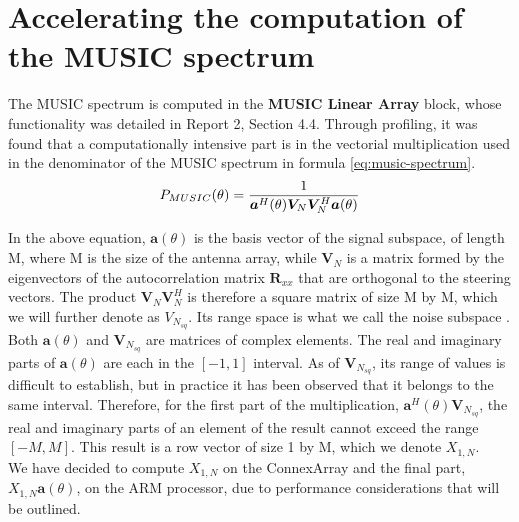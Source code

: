 \section{Accelerating the computation of the MUSIC spectrum}
\label{sec:acc-music}

The MUSIC spectrum is computed in the \textbf{MUSIC Linear Array} block, whose
functionality was detailed in Report 2, Section 4.4. Through profiling, it was
found that a computationally intensive part is in the vectorial multiplication
used in the denominator of the MUSIC spectrum in formula
\eqref{eq:music-spectrum}.
\begin{equation}
    P_{MUSIC}(\theta) =
        \frac{1}
             {\bm{a}^H(\theta)\bm{V}_N\bm{V}_N^H\bm{a}(\theta)} \\
\label{eq:music-spectrum}
\end{equation}

In the above equation, $\bm{a}(\theta)$ is the basis vector of the signal
subspace, of length M, where M is the size of the antenna array, while
$\bm{V}_N$ is a matrix formed by the eigenvectors of the autocorrelation matrix
$\bm{R}_{xx}$ that are orthogonal to the steering vectors. The product
$\bm{V}_N\bm{V}_N^H$ is therefore a square matrix of size M by M, which we will
further denote as $V_{N_{sq}}$. Its range space is what we call the noise
subspace \cite{cite:ettus-doa}. \\

Both $\bm{a}(\theta)$ and $\bm{V}_{N_{sq}}$ are matrices of complex elements. The
real and imaginary parts of $\bm{a}(\theta)$ are each in the $[-1, 1]$ interval.
As of $\bm{V}_{N_{sq}}$, its range of values is difficult to establish, but in
practice it has been observed that it belongs to the same interval. Therefore,
for the first part of the multiplication, $\bm{a}^H(\theta)\bm{V}_{N_{sq}}$, the
real and imaginary parts of an element of the result cannot exceed the range
$[-M, M]$. This result is a row vector of size 1 by M, which we denote
$X_{1,N}$. \\

We have decided to compute $X_{1,N}$ on the ConnexArray and the final part,
$X_{1,N}\bm{a}(\theta)$, on the ARM processor, due to performance considerations
that will be outlined.

